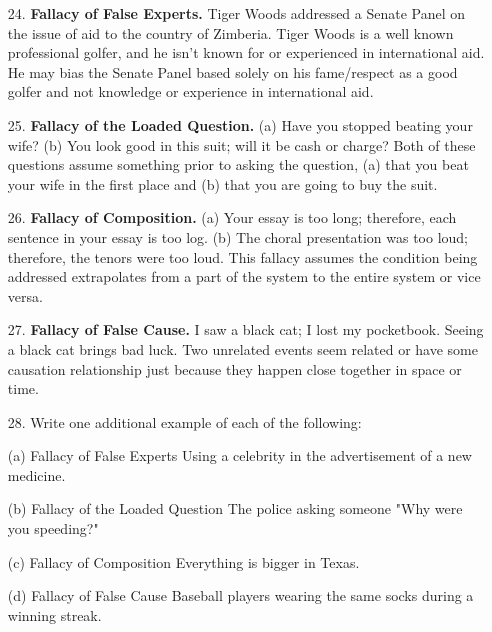 \documentclass{article}
\begin{document}
\begin{itemize}
    \item[24.] \textbf{Fallacy of False Experts.} Tiger Woods addressed a Senate Panel on the issue of aid to the country of Zimberia. {\color{blue} Tiger Woods is a well known professional golfer, and he isn't known for or experienced in international aid.  He may bias the Senate Panel based solely on his fame/respect as a good golfer and not knowledge or experience in international aid.}
    
    \item[25.] \textbf{Fallacy of the Loaded Question.} (a) Have you stopped beating your wife? (b) You look good in this suit; will it be cash or charge?  {\color{blue} Both of these questions assume something prior to asking the question, (a) that you beat your wife in the first place and (b) that you are going to buy the suit.}
    
    \item[26.] \textbf{Fallacy of Composition.} (a) Your essay is too long; therefore, each sentence in your essay is too log. (b) The choral presentation was too loud; therefore, the tenors were too loud. {\color{blue} This fallacy assumes the condition being addressed extrapolates from a part of the system to the entire system or vice versa.}
    
    \item[27.] \textbf{Fallacy of False Cause.} I saw a black cat; I lost my pocketbook.  Seeing a black cat brings bad luck.  {\color{blue} Two unrelated events seem related or have some causation relationship just because they happen close together in space or time.}
    
    \item[28.] Write one additional example of each of the following:
    
    (a) Fallacy of False Experts {\color{blue} Using a celebrity in the advertisement of a new medicine.}
    
    (b) Fallacy of the Loaded Question {\color{blue} The police asking someone "Why were you speeding?"}
    
    (c) Fallacy of Composition {\color{blue} Everything is bigger in Texas.}
    
    (d) Fallacy of False Cause {\color{blue} Baseball players wearing the same socks during a winning streak.}
    
    
\end{itemize}
\end{document}
